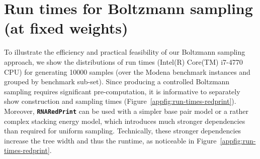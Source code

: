 \documentclass[10pt]{article}
\newcommand{\ourprog}{{\tt \bfseries{}\color{black!85}RNA\textcolor{red!70!black}{Red}Print}}
\newenvironment{revision}{\color{red}}{\color{black}}
\begin{document}
\begin{revision}

\section{Run times for Boltzmann sampling (at fixed weights)}
\label{appsec:run-times}

To illustrate the efficiency and practical feasibility of our Boltzmann sampling approach, we show the distributions of run times (Intel(R) Core(TM) i7-4770 CPU) for generating 10000 samples (over the Modena benchmark instances and grouped by benchmark sub-set). Since producing a controlled Boltzmann sampling requires significant pre-computation, it is informative to separately show construction and sampling times (Figure~\ref{appfig:run-times-redprint}). Moreover, \ourprog{} can be used with a simpler base pair model or a rather complex stacking energy model, which introduces much stronger dependencies than required for uniform sampling. Technically, these stronger dependencies increase the tree width and thus the runtime, as noticeable in Figure~\ref{appfig:run-times-redprint}.


\end{revision}
\end{document}
